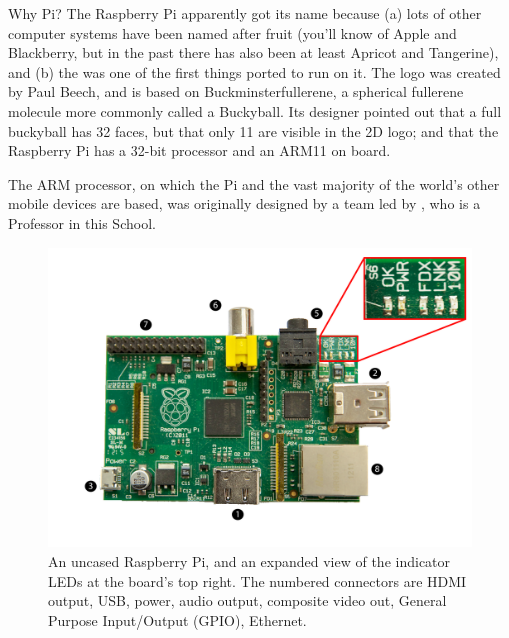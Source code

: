 \begin{rpi}{Why Pi?}
  The Raspberry Pi apparently got its name because (a) lots of other computer systems have been named after fruit (you'll know of Apple and Blackberry, but in the past there has also been at least Apricot and Tangerine), and (b) the  was one of the first things ported to run on it. The logo was created by Paul Beech, and is based on Buckminsterfullerene, a spherical fullerene molecule more commonly called a Buckyball. Its designer pointed out that a full buckyball has 32 faces, but that only 11 are visible in the 2D logo; and that the Raspberry Pi has a 32-bit processor and an ARM11 on board.

The ARM processor, on which the Pi and the vast majority of the world's other mobile devices are based, was originally designed by a team led by , who is a Professor in this School.  
\end{rpi}

\begin{figure}
\centerline{\includegraphics[width=15cm]{images/bare-rpi-annotated}}
\caption{An uncased Raspberry Pi, and an expanded view of the indicator LEDs at the board's top right. The numbered connectors are \protect{} HDMI output,  \protect{} USB,  \protect{} power,  \protect{} audio output,  \protect{} composite video out,  \protect{} General Purpose Input/Output (GPIO),  \protect{} Ethernet.}\label{figure:bare-rpi}
\end{figure}

